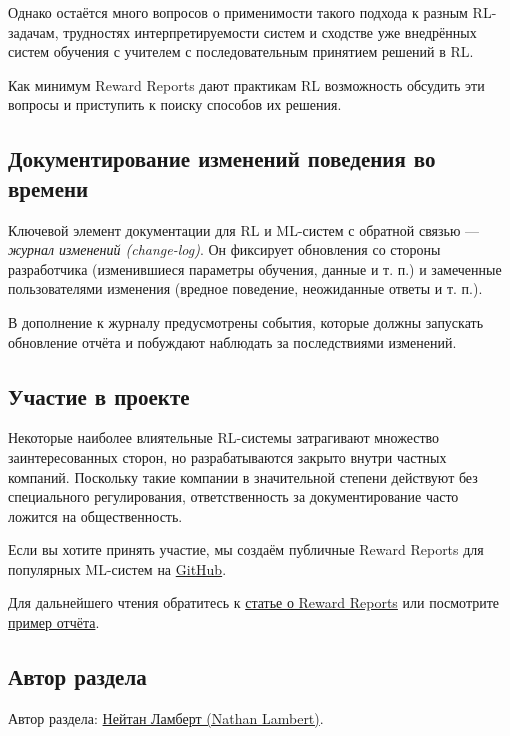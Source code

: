 \documentclass[11pt,a4paper]{article}
\begin{document}
Однако остаётся много вопросов о применимости такого подхода к разным RL-задачам, трудностях интерпретируемости систем и сходстве уже внедрённых систем обучения с учителем с последовательным принятием решений в RL.

Как минимум Reward Reports дают практикам RL возможность обсудить эти вопросы и приступить к поиску способов их решения.

\subsection{Документирование изменений поведения во времени}\label{capturing-temporal-behavior-with-documentation}

Ключевой элемент документации для RL и ML-систем с обратной связью --- \emph{журнал изменений (change-log)}. Он фиксирует обновления со стороны разработчика (изменившиеся параметры обучения, данные и т. п.) и замеченные пользователями изменения (вредное поведение, неожиданные ответы и т. п.).

В дополнение к журналу предусмотрены события, которые должны запускать обновление отчёта и побуждают наблюдать за последствиями изменений.

\subsection{Участие в проекте}\label{contributing}

Некоторые наиболее влиятельные RL-системы затрагивают множество заинтересованных сторон, но разрабатываются закрыто внутри частных компаний. Поскольку такие компании в значительной степени действуют без специального регулирования, ответственность за документирование часто ложится на общественность.

Если вы хотите принять участие, мы создаём публичные Reward Reports для популярных ML-систем на \href{https://github.com/RewardReports/reward-reports}{GitHub}.

Для дальнейшего чтения обратитесь к \href{https://arxiv.org/abs/2204.10817}{статье о Reward Reports} или посмотрите \href{https://github.com/RewardReports/reward-reports/tree/main/examples}{пример отчёта}.

\subsection{Автор раздела}\label{author-7}

Автор раздела: \href{https://twitter.com/natolambert}{Нейтан Ламберт (Nathan Lambert)}.
\end{document}
